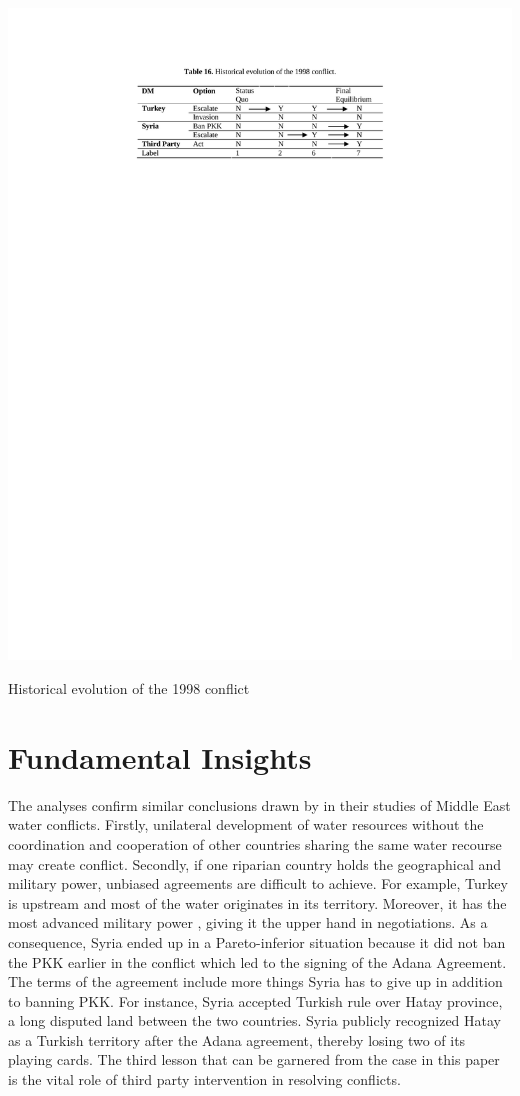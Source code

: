 \documentclass[letterpaper,12pt,titlepage,oneside,final]{book}
\begin{document}
\begin{table}[H]
\centering
\includegraphics[scale=1]{PDF-IMG/tables/16.pdf}

\caption{Historical evolution of the 1998 conflict}

\label{tbl:t16}
\end{table}

\section{Fundamental Insights}
The analyses confirm similar conclusions drawn by \citet{priscoli2009managing} in their studies of Middle East water conflicts. Firstly, unilateral development of water resources without the coordination and cooperation of other countries sharing the same water recourse may create conflict. Secondly, if one riparian country holds the geographical and military power, unbiased agreements are difficult to achieve. For example, Turkey is upstream and most of the water originates in its territory. Moreover, it has the most advanced military power \citep{priscoli2009managing}, giving it the upper hand in negotiations. As a consequence, Syria ended up in a Pareto-inferior situation because it did not ban the PKK earlier in the conflict which led to the signing of the Adana Agreement. The terms of the agreement include more things Syria has to give up in addition to banning PKK. For instance, Syria accepted Turkish rule over Hatay province, a long disputed land between the two countries. Syria publicly recognized Hatay as a Turkish territory after the Adana agreement, thereby losing two of its playing cards. The third lesson that can be garnered from the case in this paper is the vital role of third party intervention in resolving conflicts.
\end{document}
